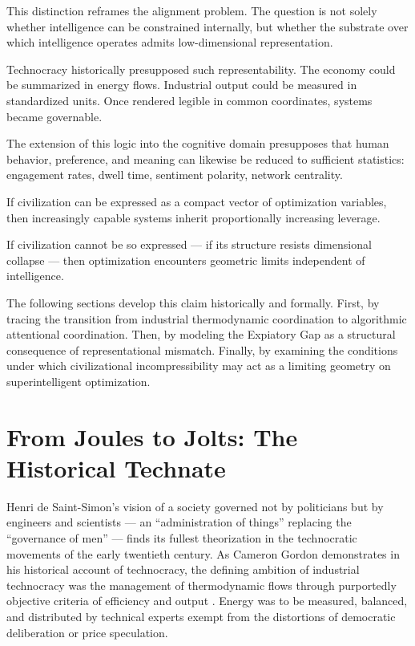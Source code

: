 \documentclass[12pt]{article}
\begin{document}
This distinction reframes the alignment problem. The question is not solely whether intelligence can be constrained internally, but whether the substrate over which intelligence operates admits low-dimensional representation.

Technocracy historically presupposed such representability. The economy could be summarized in energy flows. Industrial output could be measured in standardized units. Once rendered legible in common coordinates, systems became governable.

The extension of this logic into the cognitive domain presupposes that human behavior, preference, and meaning can likewise be reduced to sufficient statistics: engagement rates, dwell time, sentiment polarity, network centrality.

If civilization can be expressed as a compact vector of optimization variables, then increasingly capable systems inherit proportionally increasing leverage.

If civilization cannot be so expressed — if its structure resists dimensional collapse — then optimization encounters geometric limits independent of intelligence.

The following sections develop this claim historically and formally. First, by tracing the transition from industrial thermodynamic coordination to algorithmic attentional coordination. Then, by modeling the Expiatory Gap as a structural consequence of representational mismatch. Finally, by examining the conditions under which civilizational incompressibility may act as a limiting geometry on superintelligent optimization.

\section{From Joules to Jolts: The Historical Technate}

Henri de Saint-Simon's vision of a society governed not by politicians but by engineers and scientists — an ``administration of things'' replacing the ``governance of men'' — finds its fullest theorization in the technocratic movements of the early twentieth century. As Cameron Gordon demonstrates in his historical account of technocracy, the defining ambition of industrial technocracy was the management of thermodynamic flows through purportedly objective criteria of efficiency and output \cite{GordonTechnocracy2025}. Energy was to be measured, balanced, and distributed by technical experts exempt from the distortions of democratic deliberation or price speculation.
\end{document}
